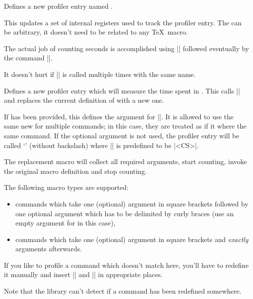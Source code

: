 \begin{command}{\pgfprofilenew{}}
	Defines a new profiler entry named .

	This updates a set of internal registers used to track the profiler entry. The  can be arbitrary, it doesn't need to be related to any \TeX\ macro.

	The actual job of counting seconds is accomplished using |\pgfprofilestart| followed eventually by the command |\pgfprofileend|.

	It doesn't hurt if |\pgfprofilenew| is called multiple times with the same name.
\end{command}

\begin{command}{\pgfprofilenewforcommand{}}
	Defines a new profiler entry which will measure the time spent in . This calls |\pgfprofilenew| and replaces the current definition of  with a new one. 
	
	If  has been provided, this defines the argument for |\pgfprofilenew|. It is allowed to use the same new for multiple commands; in this case, they are treated as if it where the same command. If the optional argument is not used, the profiler entry will be called `\declareandlabel{\pgfprofilecs}' (without backslash) where |\pgfprofilecs| is predefined to be |<CS>|. 
	
	The replacement macro will collect all required arguments, start counting, invoke the original macro definition and stop counting.

	The following macro types are supported:
	\begin{itemize}
 \item commands which take one (optional) argument in square brackets
   followed by one optional argument which has to be delimited by
   curly braces (use an empty argument for  in this case),
 \item commands which take one (optional) argument in square brackets
   and \emph{exactly}  arguments afterwards.
	\end{itemize}

	If you like to profile a command which doesn't match here, you'll have to redefine it manually and insert |\pgfprofilestart| and |\pgfprofileend| in appropriate places.

	Note that the library can't detect if a command has been redefined somewhere.
\end{command}

